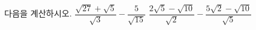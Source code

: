 다음을 계산하시오.
 $\dfrac{\sqrt{27}+\sqrt{5}}{\sqrt{3}}-\dfrac{5}{\sqrt{15}}$
 $\dfrac{2\sqrt{5}-\sqrt{10}}{\sqrt{2}}-\dfrac{5\sqrt{2}-\sqrt{10}}{\sqrt{5}}$

